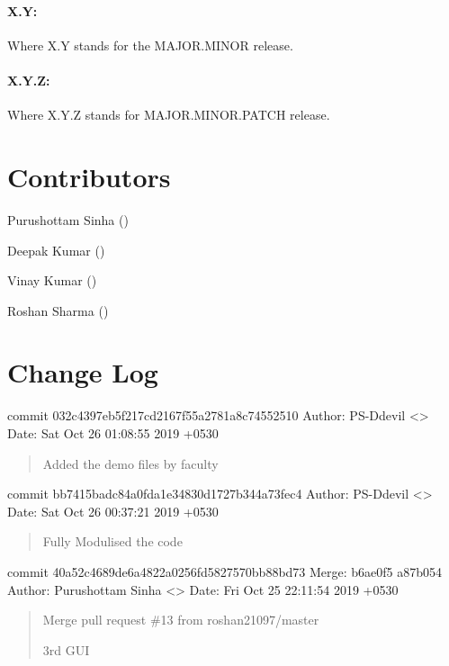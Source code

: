 \documentclass[letterpaper,10pt,english]{sphinxmanual}
\begin{document}
\paragraph{X.Y:}
\label{\detokenize{developer:x-y}}
Where X.Y stands for the MAJOR.MINOR release.


\paragraph{X.Y.Z:}
\label{\detokenize{developer:x-y-z}}
Where X.Y.Z stands for MAJOR.MINOR.PATCH release.


\section{Contributors}
\label{\detokenize{contributors:contributors}}\label{\detokenize{contributors::doc}}
Purushottam Sinha ()

Deepak Kumar ()

Vinay Kumar ()

Roshan Sharma ()


\section{Change Log}
\label{\detokenize{change:change-log}}\label{\detokenize{change::doc}}
commit 032c4397eb5f217cd2167f55a2781a8c74552510
Author: PS-Ddevil \textless{}\textgreater{}
Date:   Sat Oct 26 01:08:55 2019 +0530
\begin{quote}

Added the demo files by faculty
\end{quote}

commit bb7415badc84a0fda1e34830d1727b344a73fec4
Author: PS-Ddevil \textless{}\textgreater{}
Date:   Sat Oct 26 00:37:21 2019 +0530
\begin{quote}

Fully Modulised the code
\end{quote}

commit 40a52c4689de6a4822a0256fd5827570bb88bd73
Merge: b6ae0f5 a87b054
Author: Purushottam Sinha \textless{}\textgreater{}
Date:   Fri Oct 25 22:11:54 2019 +0530
\begin{quote}

Merge pull request \#13 from roshan21097/master

3rd GUI
\end{quote}
\end{document}
